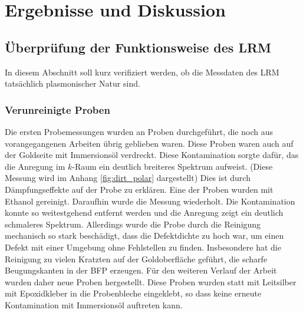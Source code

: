 \documentclass[titlepage]{article}
\begin{document}
	\section{Ergebnisse und Diskussion}
	\subsection{Überprüfung der Funktionsweise des LRM}
	In diesem Abschnitt soll kurz verifiziert werden, ob die Messdaten des LRM tatsächlich plasmonischer Natur sind.
	\subsubsection{Verunreinigte Proben}
	Die ersten Probemessungen wurden an Proben durchgeführt, die noch aus vorangegangenen Arbeiten übrig geblieben waren. Diese Proben waren auch auf der Goldseite mit Immersionsöl verdreckt. Diese Kontamination sorgte dafür, das die Anregung im $k$-Raum ein deutlich breiteres Spektrum aufweist. (Diese Messung wird im Anhang \ref{fig:dirt_polar} dargestellt) Dies ist durch Dämpfungseffekte auf der Probe zu erklären. Eine der Proben wurden mit Ethanol gereinigt. Daraufhin wurde die Messung wiederholt. Die Kontamination konnte so weitestgehend entfernt werden und die Anregung zeigt ein deutlich schmaleres Spektrum. Allerdings wurde die Probe durch die Reinigung mechanisch so stark beschädigt, dass die Defektdichte zu hoch war, um einen Defekt mit einer Umgebung ohne Fehlstellen zu finden. Insbesondere hat die Reinigung zu vielen Kratzten auf der Goldoberfläche geführt, die scharfe Beugungskanten in der BFP  erzeugen. Für den weiteren Verlauf der Arbeit wurden daher neue Proben hergestellt. Diese Proben wurden statt mit Leitsilber mit Epoxidkleber in die Probenbleche eingeklebt, so dass keine erneute Kontamination mit Immersionsöl auftreten kann.
\end{document}
